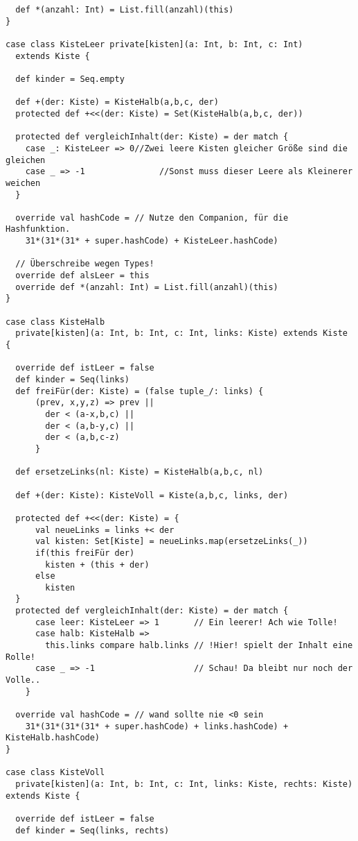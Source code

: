 \begin{lstlisting}
  def *(anzahl: Int) = List.fill(anzahl)(this)
}

case class KisteLeer private[kisten](a: Int, b: Int, c: Int)
  extends Kiste {

  def kinder = Seq.empty

  def +(der: Kiste) = KisteHalb(a,b,c, der)
  protected def +<<(der: Kiste) = Set(KisteHalb(a,b,c, der))

  protected def vergleichInhalt(der: Kiste) = der match {
    case _: KisteLeer => 0//Zwei leere Kisten gleicher Größe sind die gleichen
    case _ => -1               //Sonst muss dieser Leere als Kleinerer weichen
  }

  override val hashCode = // Nutze den Companion, für die Hashfunktion.
    31*(31*(31* + super.hashCode) + KisteLeer.hashCode)

  // Überschreibe wegen Types!
  override def alsLeer = this
  override def *(anzahl: Int) = List.fill(anzahl)(this)
}

case class KisteHalb
  private[kisten](a: Int, b: Int, c: Int, links: Kiste) extends Kiste {

  override def istLeer = false
  def kinder = Seq(links)
  def freiFür(der: Kiste) = (false tuple_/: links) {
      (prev, x,y,z) => prev ||
        der < (a-x,b,c) ||
        der < (a,b-y,c) ||
        der < (a,b,c-z)
      }

  def ersetzeLinks(nl: Kiste) = KisteHalb(a,b,c, nl)

  def +(der: Kiste): KisteVoll = Kiste(a,b,c, links, der)

  protected def +<<(der: Kiste) = {
      val neueLinks = links +< der
      val kisten: Set[Kiste] = neueLinks.map(ersetzeLinks(_))
      if(this freiFür der)
        kisten + (this + der)
      else
        kisten
  }
  protected def vergleichInhalt(der: Kiste) = der match {
      case leer: KisteLeer => 1       // Ein leerer! Ach wie Tolle!
      case halb: KisteHalb =>
        this.links compare halb.links // !Hier! spielt der Inhalt eine Rolle!
      case _ => -1                    // Schau! Da bleibt nur noch der Volle..
    }

  override val hashCode = // wand sollte nie <0 sein
    31*(31*(31*(31* + super.hashCode) + links.hashCode) + KisteHalb.hashCode)
}

case class KisteVoll
  private[kisten](a: Int, b: Int, c: Int, links: Kiste, rechts: Kiste) extends Kiste {

  override def istLeer = false
  def kinder = Seq(links, rechts)


\end{lstlisting}
